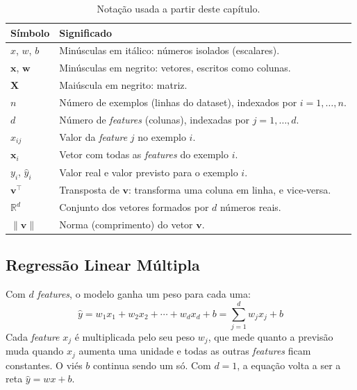 \documentclass[a4paper,12pt,openany]{book}
\begin{document}
\begin{table}[H]
\centering
\begin{tabular}{p{3.2cm} p{10.3cm}}
\toprule
\textbf{Símbolo} & \textbf{Significado} \\
\midrule
\(x\), \(w\), \(b\) & Minúsculas em itálico: números isolados (escalares). \\
\(\mathbf{x}\), \(\mathbf{w}\) & Minúsculas em negrito: vetores, escritos como colunas. \\
\(\mathbf{X}\) & Maiúscula em negrito: matriz. \\
\(n\) & Número de exemplos (linhas do dataset), indexados por \(i = 1, \dots, n\). \\
\(d\) & Número de \textit{features} (colunas), indexadas por \(j = 1, \dots, d\). \\
\(x_{ij}\) & Valor da \textit{feature} \(j\) no exemplo \(i\). \\
\(\mathbf{x}_i\) & Vetor com todas as \textit{features} do exemplo \(i\). \\
\(y_i\), \(\hat{y}_i\) & Valor real e valor previsto para o exemplo \(i\). \\
\(\mathbf{v}^\top\) & Transposta de \(\mathbf{v}\): transforma uma coluna em linha, e vice-versa. \\
\(\mathbb{R}^d\) & Conjunto dos vetores formados por \(d\) números reais. \\
\(\|\mathbf{v}\|\) & Norma (comprimento) do vetor \(\mathbf{v}\). \\
\bottomrule
\end{tabular}
\caption{Notação usada a partir deste capítulo.}
\label{tab:notacao}
\end{table}

\subsection{Regressão Linear Múltipla}

Com \(d\) \textit{features}, o modelo ganha um peso para cada uma:
\begin{equation}\label{eq:regressao_multipla}
\hat{y} = w_1 x_1 + w_2 x_2 + \cdots + w_d x_d + b = \sum_{j=1}^{d} w_j x_j + b
\end{equation}
Cada \textit{feature} \(x_j\) é multiplicada pelo seu peso \(w_j\), que mede quanto a previsão muda quando \(x_j\) aumenta uma unidade e todas as outras \textit{features} ficam constantes. O viés \(b\) continua sendo um só. Com \(d = 1\), a equação volta a ser a reta \(\hat{y} = wx + b\).
\end{document}
